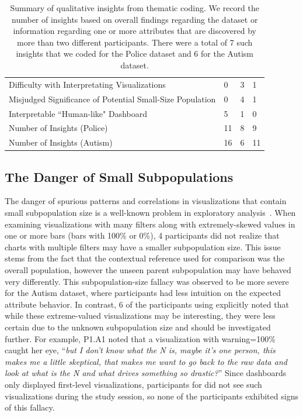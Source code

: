 \begin{table}[ht!]
	\centering
	\begin{tabular}{|l|l|l|l|}
	\hline & \system & \cluster & \BFS \\ \hline
	Difficulty with Interpretating Visualizations & 0 & \cellcolor[HTML]{FD6864}3 & 1 \\ \hline
	Misjudged Significance of Potential Small-Size Population & 0 & \cellcolor[HTML]{FD6864}4 & 1 \\ \hline
	Interpretable ``Human-like" Dashboard & \cellcolor[HTML]{9AFF99}5 & 1 & 0 \\ \hline
	Number of Insights (Police) & \cellcolor[HTML]{9AFF99}11 & 8 & 9 \\ \hline
	Number of Insights (Autism) & \cellcolor[HTML]{9AFF99}16 & 6 & 11 \\\hline
	\end{tabular}
\caption{Summary of qualitative insights from thematic coding. We record the number of insights based on overall findings regarding the dataset or information regarding one or more attributes that are discovered by more than two different participants. There were a total of 7 such insights that we coded for the Police dataset and 6 for the Autism dataset.}
\label{table:thematic_summary}
\end{table}
\subsection{The Danger of Small Subpopulations}
The danger of spurious patterns and correlations in visualizations that contain small subpopulation size is a well-known problem in exploratory analysis~\cite{Binnig2017}. When examining visualizations with many filters along with extremely-skewed values in one or more bars (bars with 100\% or 0\%), 4 \cluster participants did not realize that charts with multiple filters may have a smaller subpopulation size. This issue stems from the fact that the contextual reference used for comparison was the overall population, however the unseen parent subpopulation may have behaved very differently. This subpopulation-size fallacy was observed to be more severe for the Autism dataset, where participants had less intuition on the expected attribute behavior. In contrast, 6 of the participants using \system explicitly noted that while these extreme-valued visualizations may be interesting, they were less certain due to the unknown subpopulation size and should be investigated further. For example, P1.A1 noted that a visualization with warning=100\% caught her eye, ``\textit{but I don't know what the N is, maybe it's one person, this makes me a little skeptical, that makes me want to go back to the raw data and look at what is the N and what drives something so drastic?}'' Since \BFS dashboards only displayed first-level visualizations, participants for \BFS did not see such visualizations during the study session, so none of the \BFS participants exhibited signs of this fallacy.

